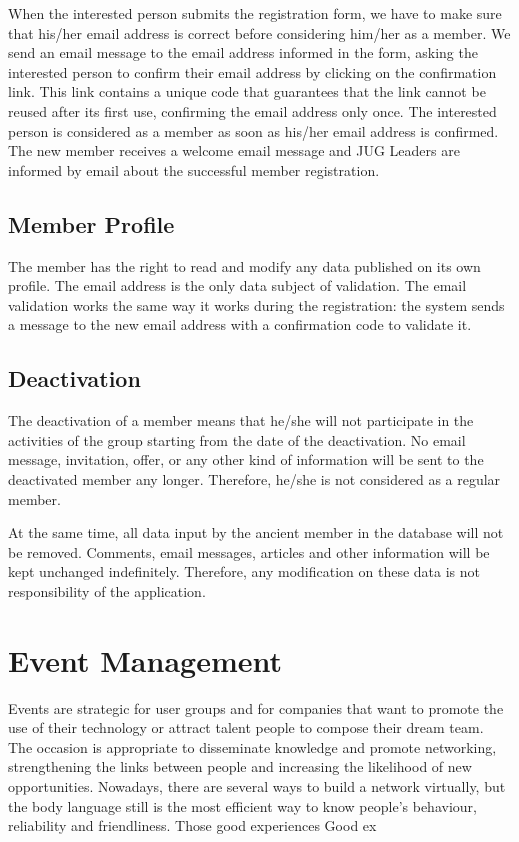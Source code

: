 \documentclass[envcountsame,envcountchap]{svmono}
\begin{document}
When the interested person submits the registration form, we have to make sure that his/her email address is correct before considering him/her as a member. We send an email message to the email address informed in the form, asking the interested person to confirm their email address by clicking on the confirmation link. This link contains a unique code that guarantees that the link cannot be reused after its first use, confirming the email address only once. The interested person is considered as a member as soon as his/her email address is confirmed. The new member receives a welcome email message and JUG Leaders are informed by email about the successful member registration.

\section{Member Profile}

The member has the right to read and modify any data published on its own profile. The email address is the only data subject of validation. The email validation works the same way it works during the registration: the system sends a message to the new email address with a confirmation code to validate it.

\section{Deactivation}

The deactivation of a member means that he/she will not participate in the activities of the group  starting from the date of the deactivation. No email message, invitation, offer, or any other kind of information will be sent to the deactivated member any longer. Therefore, he/she is not considered as a regular member.

At the same time, all data input by the ancient member in the database will not be removed. Comments, email messages, articles and other information will be kept unchanged indefinitely. Therefore, any modification on these data is not responsibility of the application.

\chapter{Event Management}
\label{chp:event-management}

Events are strategic for user groups and for companies that want to promote the use of their technology or attract talent people to compose their dream team. The occasion is appropriate to disseminate knowledge and promote networking, strengthening the links between people and increasing the likelihood of new opportunities. Nowadays, there are several ways to build a network virtually, but the body language still is the most efficient way to know people's behaviour, reliability and friendliness. Those good experiences Good ex
\end{document}
